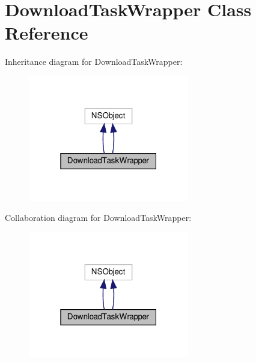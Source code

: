 \hypertarget{interfaceDownloadTaskWrapper}{}\section{Download\+Task\+Wrapper Class Reference}
\label{interfaceDownloadTaskWrapper}


Inheritance diagram for Download\+Task\+Wrapper\+:
\nopagebreak
\begin{figure}[H]
\begin{center}
\leavevmode
\includegraphics[width=199pt]{interfaceDownloadTaskWrapper__inherit__graph}
\end{center}
\end{figure}


Collaboration diagram for Download\+Task\+Wrapper\+:
\nopagebreak
\begin{figure}[H]
\begin{center}
\leavevmode
\includegraphics[width=199pt]{interfaceDownloadTaskWrapper__coll__graph}
\end{center}
\end{figure}
